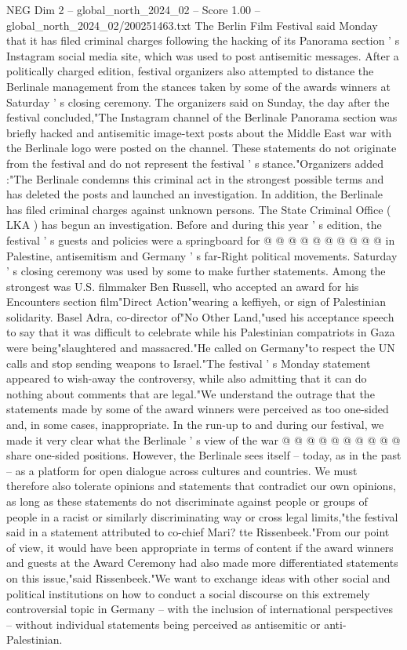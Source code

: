 \begin{textsample}{NEG Dim 2 – global\_north\_2024\_02 – Score 1.00 – global\_north\_2024\_02/200251463.txt}  \label{ex:f2_neg_181}
The Berlin Film Festival said Monday that it has filed criminal charges following the hacking of its Panorama section ' s Instagram social media site, which was used to post antisemitic messages.
After a politically charged edition, festival organizers also attempted to distance the Berlinale management from the stances taken by some of the awards winners at Saturday ' s closing ceremony.
The organizers said on Sunday, the day after the festival concluded,"The Instagram channel of the Berlinale Panorama section was briefly hacked and antisemitic image-text posts about the Middle East war with the Berlinale logo were posted on the channel.
These statements do not originate from the festival and do not represent the festival ' s stance."Organizers added :"The Berlinale condemns this criminal act in the strongest possible terms and has deleted the posts and launched an investigation.
In addition, the Berlinale has filed criminal charges against unknown persons.
The State Criminal Office ( LKA ) has begun an investigation.
Before and during this year ' s edition, the festival ' s guests and policies were a springboard for @ @ @ @ @ @ @ @ @ @ in Palestine, antisemitism and Germany ' s far-Right political movements.
Saturday ' s closing ceremony was used by some to make further statements.
Among the strongest was U.S. filmmaker Ben Russell, who accepted an award for his Encounters section film"Direct Action"wearing a keffiyeh, or sign of Palestinian solidarity.
Basel Adra, co-director of"No Other Land,"used his acceptance speech to say that it was difficult to celebrate while his Palestinian compatriots in Gaza were being"slaughtered and massacred."He called on Germany"to respect the UN calls and stop sending weapons to Israel."The festival ' s Monday statement appeared to wish-away the controversy, while also admitting that it can do nothing about comments that are legal."We understand the outrage that the statements made by some of the award winners were perceived as too one-sided and, in some cases, inappropriate.
In the run-up to and during our festival, we made it very clear what the Berlinale ' s view of the war @ @ @ @ @ @ @ @ @ @ share one-sided positions.
However, the Berlinale sees itself -- today, as in the past -- as a platform for open dialogue across cultures and countries.
We must therefore also tolerate opinions and statements that contradict our own opinions, as long as these statements do not discriminate against people or groups of people in a racist or similarly discriminating way or cross legal limits,"the festival said in a statement attributed to co-chief Mari? tte Rissenbeek."From our point of view, it would have been appropriate in terms of content if the award winners and guests at the Award Ceremony had also made more differentiated statements on this issue,"said Rissenbeek."We want to exchange ideas with other social and political institutions on how to conduct a social discourse on this extremely controversial topic in Germany -- with the inclusion of international perspectives -- without individual statements being perceived as antisemitic or anti-Palestinian.

\end{textsample}
